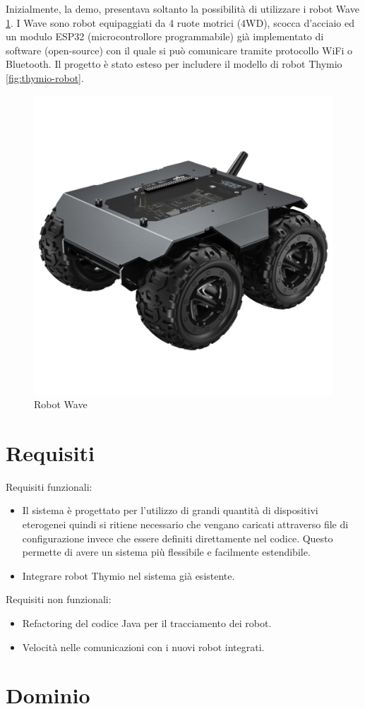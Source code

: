 \documentclass[12pt,a4paper,openright,twoside]{book}
\begin{document}
Inizialmente, la demo, presentava soltanto la possibilità di utilizzare i robot Wave \cref{fig:wave-robot}. I Wave sono robot equipaggiati da 4 ruote motrici (4WD), scocca d'acciaio ed un modulo ESP32 (microcontrollore programmabile) già implementato di software (open-source) con il quale si può comunicare tramite protocollo WiFi o Bluetooth.
Il progetto è stato esteso per includere il modello di robot Thymio \cref{fig:thymio-robot}. 

\begin{figure}
    \centering
    \includegraphics[width=.3\linewidth]{figures/wave-robot.jpg}
    \caption{Robot Wave}
    \label{fig:wave-robot}
\end{figure}

\section{Requisiti}

Requisiti funzionali:
\begin{itemize}
    \item Il sistema è progettato per l'utilizzo di grandi quantità di dispositivi eterogenei quindi si ritiene necessario che vengano caricati attraverso file di configurazione invece che essere definiti direttamente nel codice. Questo permette di avere un sistema più flessibile e facilmente estendibile.
    \item Integrare robot Thymio nel sistema già esistente.
\end{itemize}

Requisiti non funzionali:
\begin{itemize}
    \item Refactoring del codice Java per il tracciamento dei robot.
    \item Velocità nelle comunicazioni con i nuovi robot integrati.
\end{itemize}

\section{Dominio}
\end{document}
